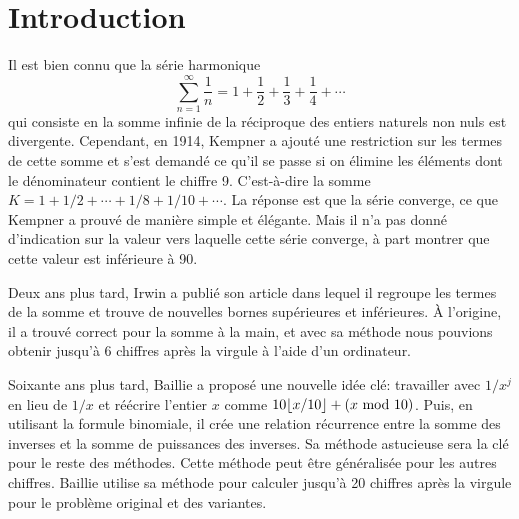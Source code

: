 \section{Introduction}
Il est bien connu que la s\'erie harmonique
\[
	\sum_{n=1}^{\infty} \frac{1}{n} = 1 + \frac{1}{2} + \frac{1}{3} +
	\frac{1}{4} + \cdots
\]
qui consiste en la somme infinie de la r\'eciproque des entiers naturels non
nuls est divergente. Cependant, en 1914, Kempner \cite{kempner} a ajout\'e une
restriction sur les termes de cette somme et s'est demand\'e ce qu'il se passe
si on \'elimine les \'el\'ements dont le d\'enominateur contient le chiffre 9.
C'est-\`a-dire la somme $K = 1 + 1/2 + \cdots + 1/8 + 1/10 + \cdots$. La r\'eponse
est que la s\'erie converge, ce que Kempner a prouv\'e de mani\`ere simple et
\'el\'egante. Mais il n'a pas donn\'e d'indication sur la valeur vers laquelle
cette s\'erie converge, \`a part montrer que cette valeur est inf\'erieure \`a
90.

Deux ans plus tard, Irwin a publi\'e son article \cite{irwin} dans lequel il
regroupe les termes de la somme et trouve de nouvelles bornes sup\'erieures et
inf\'erieures. \`A l'origine, il a trouv\'e correct pour la somme \`a la main,
et avec sa m\'ethode nous pouvions obtenir jusqu'\`a 6 chiffres apr\`es la
virgule \`a l'aide d'un ordinateur.

Soixante ans plus tard, Baillie \cite{baillie} a propos\'e une nouvelle id\'ee
cl\'e: travailler avec $1/x^{j}$ en lieu de $1/x$ et r\'e\'ecrire l'entier $x$
comme $10\lfloor x/10 \rfloor + (x\ \mathrm{mod}\ 10)$. Puis, en utilisant la formule
binomiale, il cr\'ee une relation r\'ecurrence entre la somme des inverses et la
somme de puissances des inverses. Sa m\'ethode astucieuse sera la cl\'e pour le
reste des m\'ethodes. Cette m\'ethode peut \^{e}tre g\'en\'eralis\'ee pour les
autres chiffres. Baillie utilise sa m\'ethode pour calculer jusqu'\`a 20 chiffres
apr\`es la virgule pour le probl\`eme original et des variantes.

